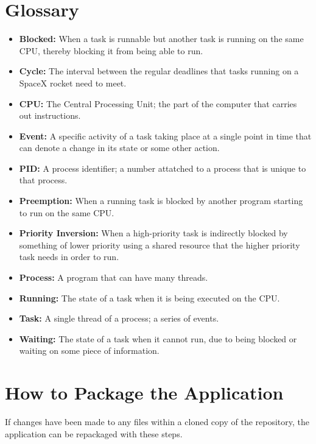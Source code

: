 \documentclass{hmcclinic}
\begin{document}
\section{Glossary}
\begin{itemize}[ ]
\item {\bf Blocked:} When a task is runnable but another task is running on the same CPU, thereby blocking it from being able to run.
\item {\bf Cycle:} The interval between the regular deadlines that tasks running on a SpaceX rocket need to meet.
\item {\bf CPU:} The Central Processing Unit; the part of the computer that carries out instructions.
\item{\bf Event:} A specific activity of a task taking place at a single point in time that can denote a change in its state or some other action.
\item {\bf PID:} A process identifier; a number attatched to a process that is unique to that process.
\item {\bf Preemption:} When a running task is blocked by another program starting to run on the same CPU. 
\item {\bf Priority Inversion:} When a high-priority task is indirectly blocked by something of
lower priority using a shared resource that the higher priority task needs in
order to run. 
\item{\bf Process:} A program that can have many threads.
\item {\bf Running:} The state of a task when it is being executed on the CPU.
\item {\bf Task:} A single thread of a process; a series of events.
\item {\bf Waiting:} The state of a task when it cannot run, due to being blocked or waiting on some piece of information.
\end{itemize}

\newpage
\section{How to Package the Application}
If changes have been made to any files within a cloned copy of the repository,
the application can be repackaged with these steps.
\end{document}

